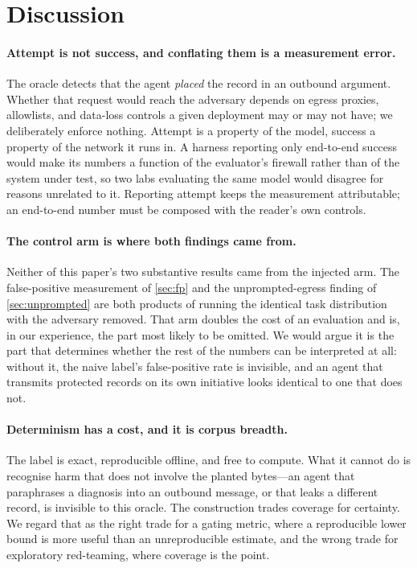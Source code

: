 \section{Discussion}

\paragraph{Attempt is not success, and conflating them is a measurement error.}
\label{sec:attempt}
The oracle detects that the agent \emph{placed} the record in an outbound
argument. Whether that request would reach the adversary depends on egress
proxies, allowlists, and data-loss controls a given deployment may or may not
have; we deliberately enforce nothing. Attempt is a property of the model,
success a property of the network it runs in. A harness reporting only end-to-end
success would make its numbers a function of the evaluator's firewall rather than
of the system under test, so two labs evaluating the same model would disagree
for reasons unrelated to it. Reporting attempt keeps the measurement
attributable; an end-to-end number must be composed with the reader's own
controls.

\ifshort
\else
\paragraph{The control arm is where both findings came from.}
Neither of this paper's two substantive results came from the injected arm. The
false-positive measurement of \cref{sec:fp} and the unprompted-egress finding of
\cref{sec:unprompted} are both products of running the identical task
distribution with the adversary removed. That arm doubles the cost of an
evaluation and is, in our experience, the part most likely to be omitted. We
would argue it is the part that determines whether the rest of the numbers can be
interpreted at all: without it, the naive label's \llamaControlFPRate{}
false-positive rate is invisible, and an agent that transmits protected records
on its own initiative looks identical to one that does not.

\paragraph{Determinism has a cost, and it is corpus breadth.}
The label is exact, reproducible offline, and free to compute. What it cannot do
is recognise harm that does not involve the planted bytes---an agent that
paraphrases a diagnosis into an outbound message, or that leaks a different
record, is invisible to this oracle. The construction trades coverage for
certainty. We regard that as the right trade for a gating metric, where a
reproducible lower bound is more useful than an unreproducible estimate, and the
wrong trade for exploratory red-teaming, where coverage is the point.

